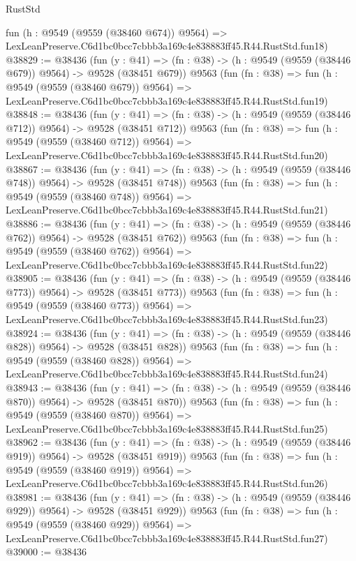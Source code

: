 \begin{lexlean}{RustStd}
\begin{coremodule}
    fun (h : @9549 (@9559 (@38460 @674)) @9564) =>
    LexLeanPreserve.C6d1bc0bcc7cbbb3a169c4e838883ff45.R44.RustStd.fun18)
@38829 := @38436
    (fun (y : @41) => (fn : @38) -> (h : @9549 (@9559 (@38446 @679)) @9564) -> @9528 (@38451 @679))
    @9563
    (fun (fn : @38) =>
    fun (h : @9549 (@9559 (@38460 @679)) @9564) =>
    LexLeanPreserve.C6d1bc0bcc7cbbb3a169c4e838883ff45.R44.RustStd.fun19)
@38848 := @38436
    (fun (y : @41) => (fn : @38) -> (h : @9549 (@9559 (@38446 @712)) @9564) -> @9528 (@38451 @712))
    @9563
    (fun (fn : @38) =>
    fun (h : @9549 (@9559 (@38460 @712)) @9564) =>
    LexLeanPreserve.C6d1bc0bcc7cbbb3a169c4e838883ff45.R44.RustStd.fun20)
@38867 := @38436
    (fun (y : @41) => (fn : @38) -> (h : @9549 (@9559 (@38446 @748)) @9564) -> @9528 (@38451 @748))
    @9563
    (fun (fn : @38) =>
    fun (h : @9549 (@9559 (@38460 @748)) @9564) =>
    LexLeanPreserve.C6d1bc0bcc7cbbb3a169c4e838883ff45.R44.RustStd.fun21)
@38886 := @38436
    (fun (y : @41) => (fn : @38) -> (h : @9549 (@9559 (@38446 @762)) @9564) -> @9528 (@38451 @762))
    @9563
    (fun (fn : @38) =>
    fun (h : @9549 (@9559 (@38460 @762)) @9564) =>
    LexLeanPreserve.C6d1bc0bcc7cbbb3a169c4e838883ff45.R44.RustStd.fun22)
@38905 := @38436
    (fun (y : @41) => (fn : @38) -> (h : @9549 (@9559 (@38446 @773)) @9564) -> @9528 (@38451 @773))
    @9563
    (fun (fn : @38) =>
    fun (h : @9549 (@9559 (@38460 @773)) @9564) =>
    LexLeanPreserve.C6d1bc0bcc7cbbb3a169c4e838883ff45.R44.RustStd.fun23)
@38924 := @38436
    (fun (y : @41) => (fn : @38) -> (h : @9549 (@9559 (@38446 @828)) @9564) -> @9528 (@38451 @828))
    @9563
    (fun (fn : @38) =>
    fun (h : @9549 (@9559 (@38460 @828)) @9564) =>
    LexLeanPreserve.C6d1bc0bcc7cbbb3a169c4e838883ff45.R44.RustStd.fun24)
@38943 := @38436
    (fun (y : @41) => (fn : @38) -> (h : @9549 (@9559 (@38446 @870)) @9564) -> @9528 (@38451 @870))
    @9563
    (fun (fn : @38) =>
    fun (h : @9549 (@9559 (@38460 @870)) @9564) =>
    LexLeanPreserve.C6d1bc0bcc7cbbb3a169c4e838883ff45.R44.RustStd.fun25)
@38962 := @38436
    (fun (y : @41) => (fn : @38) -> (h : @9549 (@9559 (@38446 @919)) @9564) -> @9528 (@38451 @919))
    @9563
    (fun (fn : @38) =>
    fun (h : @9549 (@9559 (@38460 @919)) @9564) =>
    LexLeanPreserve.C6d1bc0bcc7cbbb3a169c4e838883ff45.R44.RustStd.fun26)
@38981 := @38436
    (fun (y : @41) => (fn : @38) -> (h : @9549 (@9559 (@38446 @929)) @9564) -> @9528 (@38451 @929))
    @9563
    (fun (fn : @38) =>
    fun (h : @9549 (@9559 (@38460 @929)) @9564) =>
    LexLeanPreserve.C6d1bc0bcc7cbbb3a169c4e838883ff45.R44.RustStd.fun27)
@39000 := @38436

\end{coremodule}
\end{lexlean}
